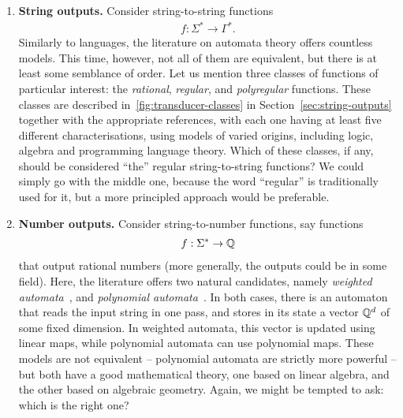 \begin{enumerate}
    \item \textbf{String outputs.}
Consider string-to-string functions 
\begin{align*}
f : \Sigma^* \to \Gamma^*.
\end{align*}
Similarly to languages, the literature on automata theory offers countless  models. This time, however, not all of them are equivalent, but there is at least some semblance of order. Let us mention three classes of functions  of particular interest:  the \emph{rational}, \emph{regular}, and \emph{polyregular} functions. These classes are described in~\cref{fig:transducer-classes} in Section~\ref{sec:string-outputs} together with the appropriate references, with each one having at least five different characterisations, using models of varied origins, including logic, algebra and programming language theory. Which of these classes, if any, should be considered ``the'' regular string-to-string functions? We could simply go with the middle one, because  the word ``regular'' is traditionally used for it, but a more principled approach would be preferable.

\item \textbf{Number outputs.}
Consider string-to-number functions, say functions 
\begin{align*}
f : \Sigma^* \to {\mathbb Q}
\end{align*}
that output rational numbers (more generally, the outputs could be in some field). Here, the literature offers two natural candidates, namely \emph{weighted automata}~\cite{schutzenberger1961definition}, and \emph{polynomial automata}~\cite[Section IV]{DBLP:conf/lics/BenediktDSW17}. In both cases, there is an automaton that reads the input string in one pass, and stores in its state a vector ${\mathbb Q}^d$ of some fixed dimension. In weighted automata, this vector is updated using linear maps, while polynomial automata can use polynomial maps. These models are not equivalent -- polynomial automata are strictly more powerful -- but both have a good mathematical theory, one based on linear algebra, and the other based on algebraic geometry. Again, we might be tempted to ask: which  is the right one?


\end{enumerate}
